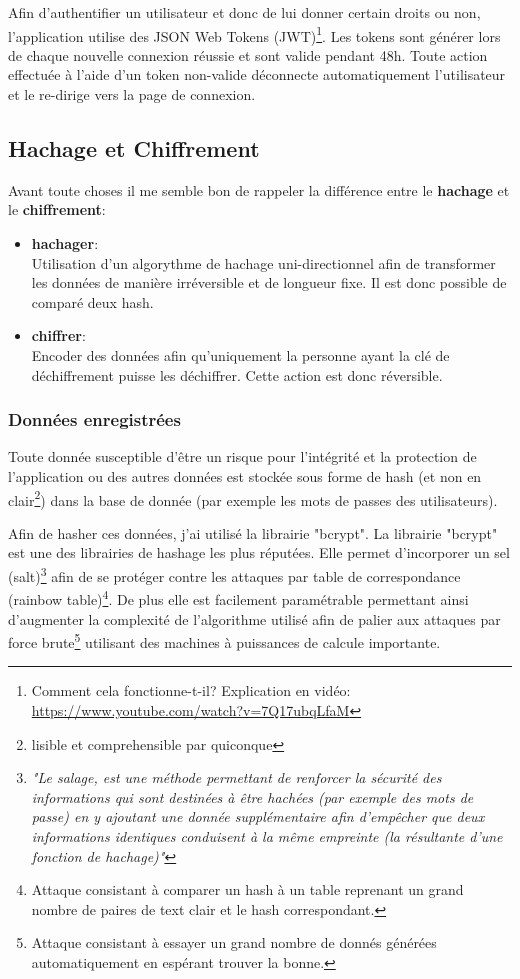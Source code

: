 Afin d'authentifier un utilisateur et donc de lui donner certain droits ou non, l'application utilise des JSON Web Tokens (JWT)\footnote{Comment cela fonctionne-t-il? Explication en vidéo: \url{https://www.youtube.com/watch?v=7Q17ubqLfaM}}. Les tokens sont générer lors de chaque nouvelle connexion réussie et sont valide pendant 48h. Toute action effectuée à l'aide d'un token non-valide déconnecte automatiquement l'utilisateur et le re-dirige vers la page de connexion. 

\newpage

\subsection{Hachage et Chiffrement}

Avant toute choses il me semble bon de rappeler la différence entre le \textbf{hachage} et le \textbf{chiffrement}: 
\begin{itemize}
  \item \textbf{hachager}: \\ Utilisation d'un algorythme de hachage uni-directionnel afin de transformer les données de manière irréversible et de longueur fixe. Il est donc possible de comparé deux hash.
  \item \textbf{chiffrer}: \\ Encoder des données afin qu'uniquement la personne ayant la clé de déchiffrement puisse les déchiffrer. Cette action est donc réversible.
\end{itemize}

\subsubsection{Données enregistrées}
Toute donnée susceptible d'être un risque pour l'intégrité et la protection de l'application ou des autres données est stockée sous forme de hash (et non en clair\footnote{lisible et comprehensible par quiconque}) dans la base de donnée (par exemple les mots de passes des utilisateurs). 

\newpara

Afin de hasher ces données, j'ai utilisé la librairie "bcrypt". La librairie "bcrypt" est une des librairies de hashage les plus réputées. Elle permet d'incorporer un sel (salt)\footnote{\textit{"Le salage, est une méthode permettant de renforcer la sécurité des informations qui sont destinées à être hachées (par exemple des mots de passe) en y ajoutant une donnée supplémentaire afin d’empêcher que deux informations identiques conduisent à la même empreinte (la résultante d’une fonction de hachage)"}\cite{Salt}} afin de se protéger contre les attaques par table de correspondance (rainbow table)\footnote{Attaque consistant à comparer un hash à un table reprenant un grand nombre de paires de text clair et le hash correspondant.}. De plus elle est facilement paramétrable permettant ainsi d'augmenter la complexité de l'algorithme utilisé afin de palier aux attaques par force brute\footnote{Attaque consistant à essayer un grand nombre de donnés générées automatiquement en espérant trouver la bonne.} utilisant des machines à puissances de calcule importante. 

